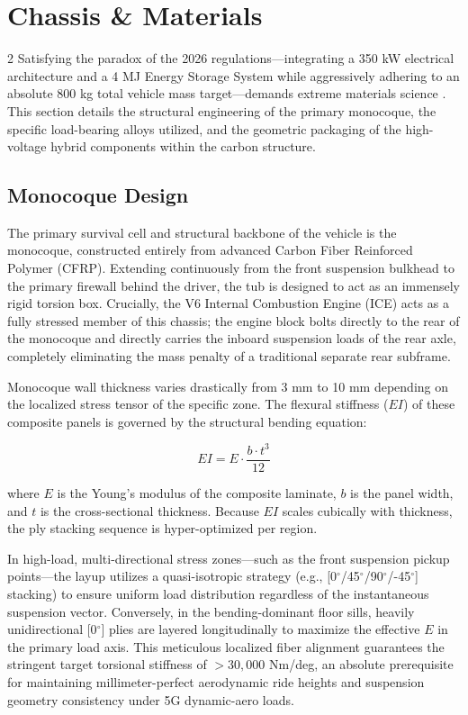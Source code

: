 \section{Chassis \& Materials}

\begin{multicols}{2}
Satisfying the paradox of the 2026 regulations—integrating a 350 kW electrical architecture and a 4 MJ Energy Storage System while aggressively adhering to an absolute 800 kg total vehicle mass target—demands extreme materials science \cite{FIA_2026_Chassis_Regulations}. This section details the structural engineering of the primary monocoque, the specific load-bearing alloys utilized, and the geometric packaging of the high-voltage hybrid components within the carbon structure.

\subsection{Monocoque Design}

The primary survival cell and structural backbone of the vehicle is the monocoque, constructed entirely from advanced Carbon Fiber Reinforced Polymer (CFRP). Extending continuously from the front suspension bulkhead to the primary firewall behind the driver, the tub is designed to act as an immensely rigid torsion box. Crucially, the V6 Internal Combustion Engine (ICE) acts as a fully stressed member of this chassis; the engine block bolts directly to the rear of the monocoque and directly carries the inboard suspension loads of the rear axle, completely eliminating the mass penalty of a traditional separate rear subframe.

Monocoque wall thickness varies drastically from 3 mm to 10 mm depending on the localized stress tensor of the specific zone. The flexural stiffness ($EI$) of these composite panels is governed by the structural bending equation:

\begin{equation} \label{eq:bending_stiffness}
EI = E \cdot \frac{b \cdot t^3}{12}
\end{equation}

where $E$ is the Young’s modulus of the composite laminate, $b$ is the panel width, and $t$ is the cross-sectional thickness. Because $EI$ scales cubically with thickness, the ply stacking sequence is hyper-optimized per region. 

In high-load, multi-directional stress zones—such as the front suspension pickup points—the layup utilizes a quasi-isotropic strategy (e.g., [0$^\circ$/45$^\circ$/90$^\circ$/-45$^\circ$] stacking) to ensure uniform load distribution regardless of the instantaneous suspension vector. Conversely, in the bending-dominant floor sills, heavily unidirectional [0$^\circ$] plies are layered longitudinally to maximize the effective $E$ in the primary load axis. This meticulous localized fiber alignment guarantees the stringent target torsional stiffness of $>30,000$ Nm/deg, an absolute prerequisite for maintaining millimeter-perfect aerodynamic ride heights and suspension geometry consistency under 5G dynamic-aero loads.


\end{multicols}
